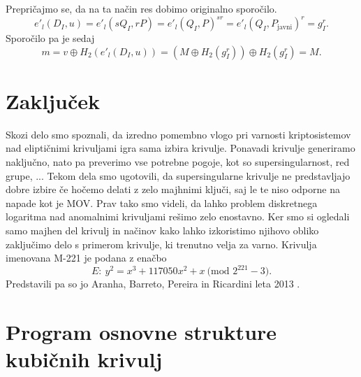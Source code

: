 \documentclass[12pt,a4paper,twoside]{article}
\newcommand{\literatura}{literatura}  %
\theoremstyle{definition} %
\theoremstyle{plain} %
\numberwithin{equation}{section}  %
\newcommand{\MOD}[1]{\ \text{(mod }{#1}\text{)}}
\begin{document}
Prepričajmo se, da na ta način res dobimo originalno sporočilo.
$$e'_l(D_I,u) = e'_l(sQ_I,rP) = e'_l(Q_I,P)^{sr}= e'_l(Q_I,P_{\text{javni}})^r = g^r_I.$$
Sporočilo pa je sedaj
$$m = v \oplus H_2(e'_l(D_I,u)) = (M \oplus H_2(g^r_I)) \oplus H_2(g^r_I) = M.$$




\newpage

\section{Zaključek}

Skozi delo smo spoznali, da izredno pomembno vlogo pri varnosti kriptosistemov nad eliptičnimi krivuljami igra sama izbira krivulje. Ponavadi krivulje generiramo naključno, nato pa preverimo vse potrebne pogoje, kot so supersingularnost, red grupe, ... Tekom dela smo ugotovili, da supersingularne krivulje ne predstavljajo dobre izbire če hočemo delati z zelo majhnimi ključi, saj le te niso odporne na napade kot je MOV. Prav tako smo videli, da lahko problem diskretnega logaritma nad anomalnimi krivuljami rešimo zelo enostavno. Ker smo si ogledali samo majhen del krivulj in načinov kako lahko izkoristimo njihovo obliko zaključimo delo s primerom krivulje, ki trenutno velja za varno. Krivulja imenovana M-221 je podana z enačbo
$$E:\ y^2 = x^3+117050x^2+x \MOD{2^{221} - 3}.$$
Predstavili pa so jo Aranha, Barreto, Pereira in  Ricardini leta 2013 \cite{Aranha2013}.

\appendix

\section{Program osnovne strukture kubičnih krivulj}









\cleardoublepage                           %

\cleardoublepage                           %
\printindex
\end{document}
